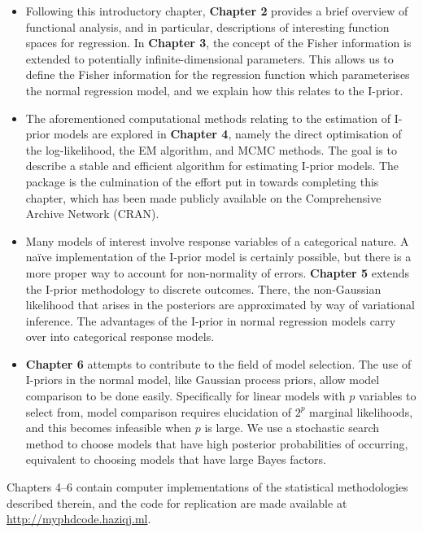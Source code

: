 \documentclass[a4paper,showframe,11pt]{report}
\begin{document}
\begin{itemize}
  \item Following this introductory chapter, \textbf{Chapter 2} provides a brief overview of functional analysis, and in particular, descriptions of interesting function spaces for regression.
  In \textbf{Chapter 3}, the concept of the Fisher information is extended to potentially infinite-dimensional parameters.
  This allows us to define the Fisher information for the regression function which parameterises the normal regression model, and we explain how this relates to the I-prior.
  
  \item The aforementioned computational methods relating to the estimation of I-prior models are explored in \textbf{Chapter 4}, namely the direct optimisation of the log-likelihood, the EM algorithm, and MCMC methods.
  The goal is to describe a stable and efficient algorithm for estimating I-prior models.
  The  package  is the culmination of the effort put in towards completing this chapter, which has been made publicly available on the Comprehensive  Archive Network (CRAN).

  \item Many models of interest involve response variables of a categorical nature.
  A naïve implementation of the I-prior model is certainly possible, but there is  a more proper way to account for non-normality of errors.
  \textbf{Chapter 5} extends the I-prior methodology to discrete outcomes.
  There, the non-Gaussian likelihood that arises in the posteriors are approximated by way of variational inference.
  The advantages of the I-prior in normal regression models carry over into categorical response models.

  \item \textbf{Chapter 6} attempts to contribute to the field of model selection.
  The use of I-priors in the normal model, like Gaussian process priors, allow model comparison to be done easily.
  Specifically for linear models with $p$ variables to select from, model comparison requires elucidation of $2^p$ marginal likelihoods, and this becomes infeasible when $p$ is large.
  We use a stochastic search method to choose models that have high posterior probabilities of occurring, equivalent to choosing models that have large Bayes factors.
\end{itemize}

Chapters 4--6 contain computer implementations of the statistical methodologies described therein, and the code for replication are made available at \url{http://myphdcode.haziqj.ml}.

\hClosingStuffStandalone
\end{document}

